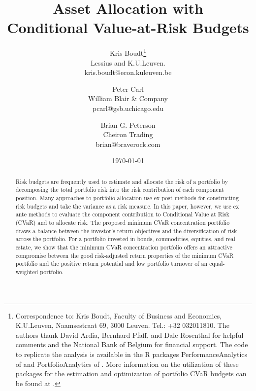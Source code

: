 \documentclass[12pt,a4paper]{article}
\renewcommand{\baselinestretch}{1.3}
\begin{document}
\vspace{-2cm}
\renewcommand{\baselinestretch}{1}
\title{Asset Allocation with \\ Conditional Value-at-Risk Budgets}

\smallskip

\author{
Kris Boudt\thanks{Correspondence to: Kris Boudt,
Faculty of Business and Economics, K.U.Leuven, Naamsestraat 69, 3000 Leuven. Tel.: +32 032011810. The authors thank David Ardia, Bernhard Pfaff, and Dale Rosenthal for helpful comments and the National Bank of Belgium for financial support. The code to replicate the analysis is available in the R packages PerformanceAnalytics of \citet{PerformanceAnalytics} and PortfolioAnalytics of \citet{PortfolioAnalytics}. More information on the utilization of these packages for the estimation and optimization of portfolio CVaR budgets can be found at \web.}\\
Lessius and K.U.Leuven.\\
kris.boudt@econ.kuleuven.be
 \and Peter Carl\\
William Blair \& Company  \\
pcarl@gsb.uchicago.edu\\
\and Brian G. Peterson\\
Cheiron Trading\\
brian@braverock.com}

\date{\today}

\maketitle
\thispagestyle{empty} %

\vspace{-0.5cm}

\renewcommand{\baselinestretch}{1}
\begin{abstract}
Risk budgets are frequently used to estimate and allocate the risk of a portfolio by decomposing the total portfolio risk into the risk contribution of each component position. Many approaches to portfolio allocation use ex post methods for constructing risk budgets and take the variance as a risk measure. In this paper, however, we use ex ante methods to evaluate the component contribution to Conditional Value at Risk (CVaR) and to allocate risk. The proposed minimum CVaR concentration portfolio draws a balance between the investor's return objectives and the diversification of risk across the portfolio. For a portfolio invested in bonds, commodities, equities, and real estate, we show that the minimum CVaR concentration portfolio offers an attractive compromise between the good risk-adjusted return properties of the minimum CVaR portfolio and the positive return potential and low portfolio turnover of an equal-weighted portfolio.
\end{abstract}
\end{document}
